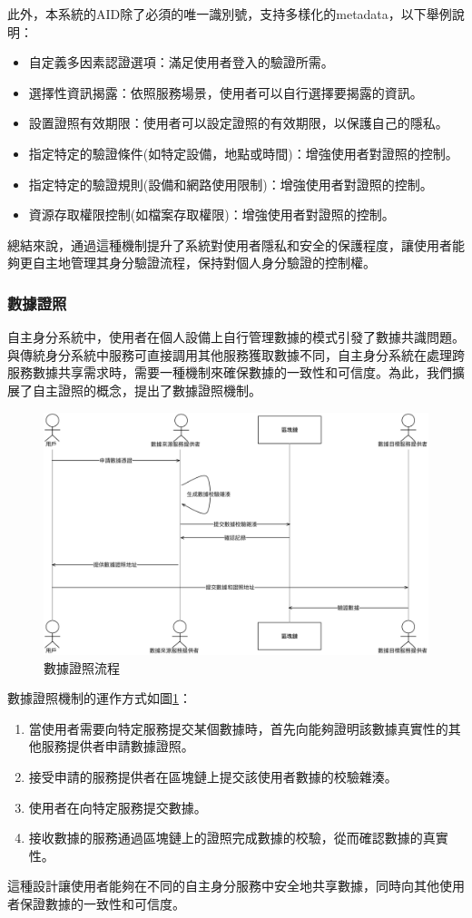 此外，本系統的AID除了必須的唯一識別號，支持多樣化的metadata，以下舉例說明：
\begin{itemize}
  \item 自定義多因素認證選項：滿足使用者登入的驗證所需。
  \item 選擇性資訊揭露：依照服務場景，使用者可以自行選擇要揭露的資訊。
  \item 設置證照有效期限：使用者可以設定證照的有效期限，以保護自己的隱私。
  \item 指定特定的驗證條件(如特定設備，地點或時間)：增強使用者對證照的控制。
  \item 指定特定的驗證規則(設備和網路使用限制)：增強使用者對證照的控制。
  \item 資源存取權限控制(如檔案存取權限)：增強使用者對證照的控制。
\end{itemize}

總結來說，通過這種機制提升了系統對使用者隱私和安全的保護程度，讓使用者能夠更自主地管理其身分驗證流程，保持對個人身分驗證的控制權。
\subsubsection{數據證照}
自主身分系統中，使用者在個人設備上自行管理數據的模式引發了數據共識問題。與傳統身分系統中服務可直接調用其他服務獲取數據不同，自主身分系統在處理跨服務數據共享需求時，需要一種機制來確保數據的一致性和可信度。為此，我們擴展了自主證照的概念，提出了數據證照機制。
\begin{figure}
  \centering
  \includegraphics[width=\linewidth,keepaspectratio]{figures/flow-dc.png}
  \caption{數據證照流程}
  \label{fig:flow-dc}
\end{figure}
數據證照機制的運作方式如圖\ref{fig:flow-dc}：
\begin{enumerate}
  \item 當使用者需要向特定服務提交某個數據時，首先向能夠證明該數據真實性的其他服務提供者申請數據證照。
  \item 接受申請的服務提供者在區塊鏈上提交該使用者數據的校驗雜湊。
  \item 使用者在向特定服務提交數據。
  \item 接收數據的服務通過區塊鏈上的證照完成數據的校驗，從而確認數據的真實性。
\end{enumerate}
這種設計讓使用者能夠在不同的自主身分服務中安全地共享數據，同時向其他使用者保證數據的一致性和可信度。

